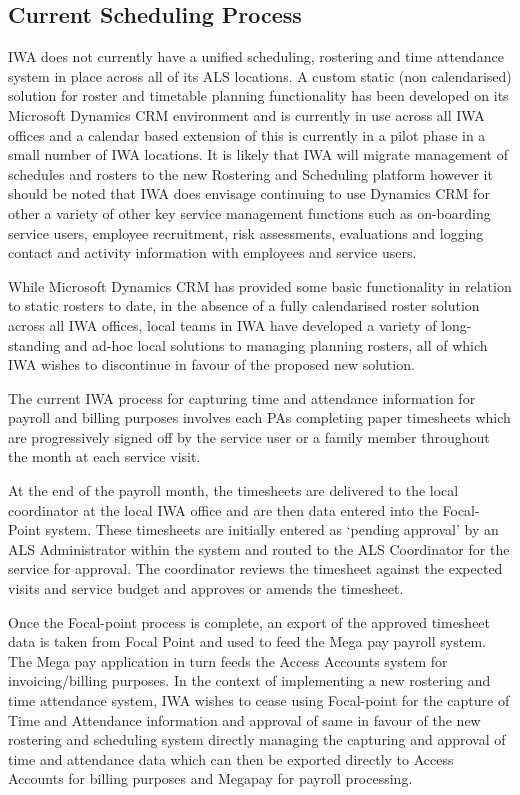 \documentclass[a4paper,Times New Roman 11pt]{article}
\begin{document}
\begin{samepage}
\subsection {Current Scheduling Process}
IWA does not currently have a unified scheduling, rostering and time attendance system in place across all of its ALS locations. A custom static (non calendarised) solution for roster and timetable planning functionality has been developed on its Microsoft Dynamics CRM environment and is currently in use across all IWA offices and a calendar based extension of this is currently in a pilot phase in a small number of IWA locations.  It is likely that IWA will migrate management of schedules and rosters to the new Rostering and Scheduling  platform however it should be noted that IWA does envisage continuing to use Dynamics CRM for other a variety of other key service management functions such as on-boarding service users, employee recruitment, risk assessments, evaluations and logging contact and activity information with employees and service users. 

While Microsoft Dynamics CRM has provided some basic functionality in relation to static rosters to date, in the absence of a fully calendarised roster solution across all IWA offices, local teams in IWA have developed a variety of long-standing and ad-hoc local solutions to managing planning rosters, all of which IWA wishes to discontinue in favour of the proposed new solution. 

The current IWA process for capturing  time and attendance information for payroll and billing purposes involves each PAs completing paper timesheets which are progressively signed off by the service user or a family member throughout the month at each service visit. 

At the end of the payroll month, the timesheets are delivered to the local coordinator at the local IWA office and are then data entered into the Focal-Point system. These timesheets are initially entered as ‘pending approval’ by an ALS Administrator within the system and routed to the ALS Coordinator for the service for approval. The coordinator reviews the timesheet against the expected visits and service budget and approves or amends the timesheet.

Once the Focal-point process is complete, an export of the approved timesheet data is taken from Focal Point and used to feed the Mega pay payroll system. The Mega pay application in turn feeds the Access Accounts system for invoicing/billing purposes. 
In the context of implementing a new rostering and time attendance system, IWA wishes to cease using Focal-point for the capture of Time and Attendance information and approval of same in favour of the new rostering and scheduling system directly managing the capturing and approval of time and attendance data which can then be exported directly to Access Accounts for billing purposes and Megapay for payroll processing.


\end{samepage}
\end{document}
